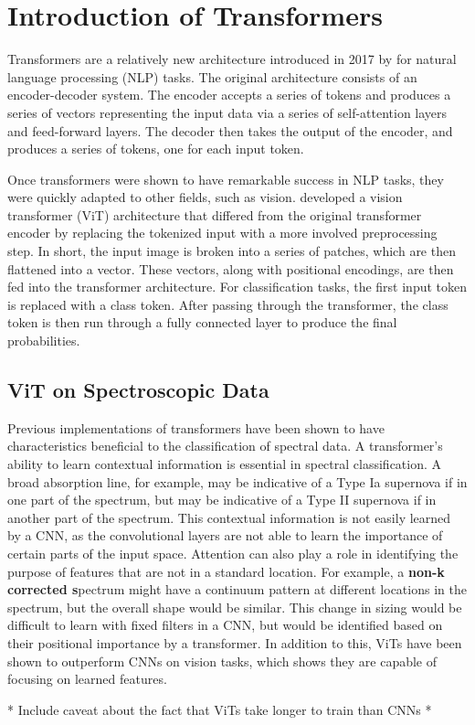 \section{Introduction of Transformers}\label{sec:transformers}
Transformers are a relatively new architecture introduced in 2017 by \textcite{vaswani2017}
for natural language processing (NLP) tasks. The original architecture consists of 
an encoder-decoder system. The encoder accepts a series of tokens and produces a series of vectors
representing the input data via a series 
of self-attention layers and feed-forward layers. The decoder then takes the output of the encoder, and
produces a series of tokens, one for each input token. 

Once transformers were shown to have remarkable success in NLP tasks, they were 
quickly adapted to other fields, such as vision. \textcite{dosovitskiy2020} developed 
a vision transformer (ViT) architecture that differed from the original transformer 
encoder by replacing the tokenized input with a more involved preprocessing step. In short, 
the input image is broken into a series of patches, which are then flattened into
a vector. These vectors, along with positional encodings, are then fed into the
transformer architecture. For classification tasks, the first input token is 
replaced with a class token. After passing through the transformer, the class token 
is then run through a fully connected layer to produce the final probabilities. 

\subsection{ViT on Spectroscopic Data}\label{sec:ViT}
Previous implementations of transformers have been shown to have characteristics 
beneficial to the classification of spectral data. A transformer's 
ability to learn contextual information is essential in spectral classification. 
A broad absorption line, for example, may be indicative of a Type Ia supernova 
if in one part of the spectrum, but may be indicative of a Type II supernova if
in another part of the spectrum. This contextual information is not easily learned 
by a CNN, as the convolutional layers are not able to learn the importance of
certain parts of the input space. Attention can also play a role in identifying 
the purpose of features that are not in a standard location. For example, a 
\textbf{non-k corrected s}pectrum might have a continuum pattern at different locations 
in the spectrum, but the overall shape would be similar. This change in sizing 
would be difficult to learn with fixed filters in a CNN, but would be identified 
based on their positional importance by a transformer. In addition to this, ViTs 
have been shown to outperform CNNs on vision tasks, which shows they are capable 
of focusing on learned features. 


* Include caveat about the fact that ViTs take longer to train than CNNs *

